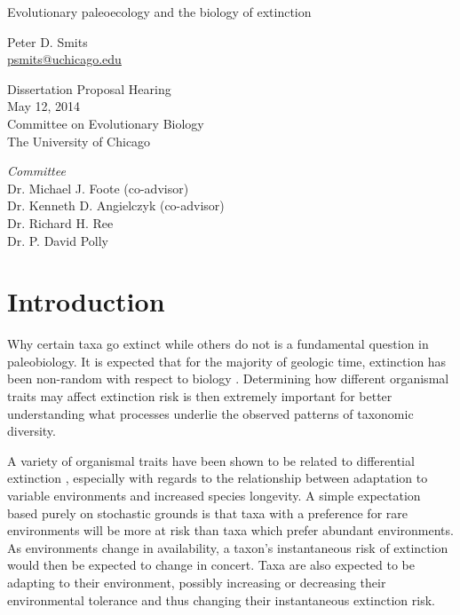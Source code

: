 \documentclass[12pt,letterpaper]{article}
\begin{document}
\begin{titlepage}
  \begin{center}
    \huge{Evolutionary paleoecology and the biology of extinction}

    \vspace{1.5cm}

    \large{Peter D. Smits \\}
    \footnotesize{\href{mailto:psmits@uchicago.edu}{psmits@uchicago.edu}}

    \vspace{1.5cm}

    Dissertation Proposal Hearing \\
    May 12, 2014\\
    Committee on Evolutionary Biology \\
    The University of Chicago

    \vspace{1.5cm}

    \textit{Committee} \\
    Dr. Michael J. Foote (co-advisor) \\
    Dr. Kenneth D. Angielczyk (co-advisor) \\
    Dr. Richard H. Ree \\
    Dr. P. David Polly
  \end{center}
\end{titlepage}

\linenumbers
\modulolinenumbers[2]

\section{Introduction}
Why certain taxa go extinct while others do not is a fundamental question in paleobiology. It is expected that for the majority of geologic time, extinction has been non-random with respect to biology \citep{Jablonski1986,Alexander1977,Harnik2011,Johnson2002b,Kitchell1986,Nurnberg2013a,Payne2007}. Determining how different organismal traits may affect extinction risk is then extremely important for better understanding what processes underlie the observed patterns of taxonomic diversity. 

A variety of organismal traits have been shown to be related to differential extinction \citep{Foote2013,Liow2007b,Baumiller1993,Nurnberg2013a,Alexander1977,Kitchell1986}, especially with regards to the relationship between adaptation to variable environments and increased species longevity. A simple expectation based purely on stochastic grounds is that taxa with a preference for rare environments will be more at risk than taxa which prefer abundant environments. As environments change in availability, a taxon's instantaneous risk of extinction would then be expected to change in concert. Taxa are also expected to be adapting to their environment, possibly increasing or decreasing their environmental tolerance and thus changing their instantaneous extinction risk. 
\end{document}
